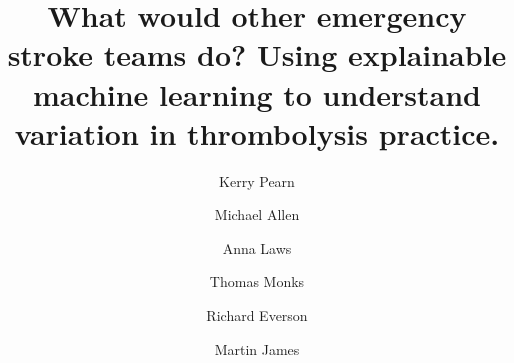 \title{What would other emergency stroke teams do? Using explainable machine learning to understand variation in thrombolysis practice.}


\renewcommand{\thefootnote}{\fnsymbol{footnote}}
\author[1,2]{Kerry Pearn}
\author[*1,2]{Michael Allen}
\author[1,2]{Anna Laws}
\author[1,2]{Thomas Monks}
\author[4]{Richard Everson}
\author[2,3]{Martin James}

